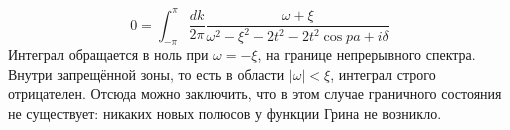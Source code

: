 \begin{equation}
	0=\int_{-\pi}^{\pi} \frac{dk}{2\pi} 
		\frac{\omega + \xi}{\omega^2 - \xi^2 - 2t^2 - 2t^2\cos{pa} + i\delta} 
\end{equation}
Интеграл обращается в ноль при $\omega = -\xi$, на границе непрерывного спектра. Внутри
запрещённой зоны, то есть в области $|\omega| < \xi$, интеграл строго отрицателен. Отсюда
можно заключить, что в этом случае граничного состояния не существует: никаких новых
полюсов у функции Грина не возникло.
